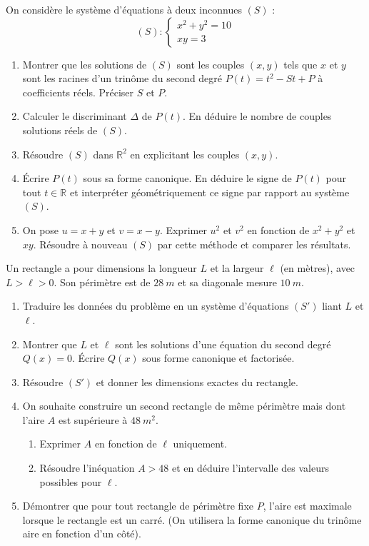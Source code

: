 \documentclass[11pt]{article}
\begin{document}
\begin{exercice}
On considère le système d'équations à deux inconnues $(S)$ :
\[
(S) : \begin{cases}
x^2 + y^2 = 10 \\
xy = 3
\end{cases}
\]
\begin{enumerate}
    \item Montrer que les solutions de $(S)$ sont les couples $(x,y)$ tels que $x$ et $y$ sont les racines d'un trinôme du second degré $P(t)=t^2 - St + P$ à coefficients réels. Préciser $S$ et $P$.
    \item Calculer le discriminant $\Delta$ de $P(t)$. En déduire le nombre de couples solutions réels de $(S)$.
    \item Résoudre $(S)$ dans $\mathbb{R}^2$ en explicitant les couples $(x,y)$.
    \item Écrire $P(t)$ sous sa forme canonique. En déduire le signe de $P(t)$ pour tout $t \in \mathbb{R}$ et interpréter géométriquement ce signe par rapport au système $(S)$.
    \item On pose $u=x+y$ et $v=x-y$. Exprimer $u^2$ et $v^2$ en fonction de $x^2+y^2$ et $xy$. Résoudre à nouveau $(S)$ par cette méthode et comparer les résultats.
\end{enumerate}
\end{exercice}

\begin{exercice}
Un rectangle a pour dimensions la longueur $L$ et la largeur $\ell$ (en mètres), avec $L > \ell > 0$. Son périmètre est de $\SI{28}{m}$ et sa diagonale mesure $\SI{10}{m}$.
\begin{enumerate}
    \item Traduire les données du problème en un système d'équations $(S')$ liant $L$ et $\ell$.
    \item Montrer que $L$ et $\ell$ sont les solutions d'une équation du second degré $Q(x)=0$. Écrire $Q(x)$ sous forme canonique et factorisée.
    \item Résoudre $(S')$ et donner les dimensions exactes du rectangle.
    \item On souhaite construire un second rectangle de même périmètre mais dont l'aire $A$ est supérieure à $\SI{48}{m^2}$. 
    \begin{enumerate}
        \item Exprimer $A$ en fonction de $\ell$ uniquement.
        \item Résoudre l'inéquation $A > 48$ et en déduire l'intervalle des valeurs possibles pour $\ell$.
    \end{enumerate}
    \item Démontrer que pour tout rectangle de périmètre fixe $P$, l'aire est maximale lorsque le rectangle est un carré. (On utilisera la forme canonique du trinôme aire en fonction d'un côté).
\end{enumerate}
\end{exercice}
\end{document}
